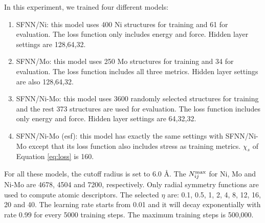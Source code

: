 \documentclass[preprint]{revtex4-2}
\begin{document}
In this experiment, we trained four different models:
\begin{enumerate}
    \item SFNN/Ni: this model uses 400 Ni structures for training and 61 for 
    evaluation. The loss function only includes energy and force. Hidden layer 
    settings are 128,64,32.
    \item SFNN/Mo: this model uses 250 Mo structures for training and 34 for 
    evaluation. The loss function includes all three metrics. Hidden layer 
    settings are also 128,64,32.
    \item SFNN/Ni-Mo: this model uses 3600 randomly selected structures for 
    training and the rest 373 structures are used for evaluation. The loss 
    function includes only energy and force. Hidden layer settings are 64,32,32.
    \item SFNN/Ni-Mo (esf): this model has exactly the same settings with 
    SFNN/Ni-Mo except that its loss function also includes stress as training 
    metrics. $\chi_{s}$ of Equation \ref{eq:loss} is 160.
\end{enumerate}

For all these models, the cutoff radius is set to 6.0 \AA. The $N_{ij}^{\mathrm{max}}$ for Ni, 
Mo and Ni-Mo are 4678, 4504 and 7200, respectively. Only radial symmetry 
functions are used to compute atomic descriptors. The selected $\eta$ are: 
0.1, 0.5, 1, 2, 4, 8, 12, 16, 20 and 40. The learning rate starts from 0.01 and 
it will decay exponentially with rate 0.99 for every 5000 training steps. The
maximum training steps is 500,000.
\end{document}
